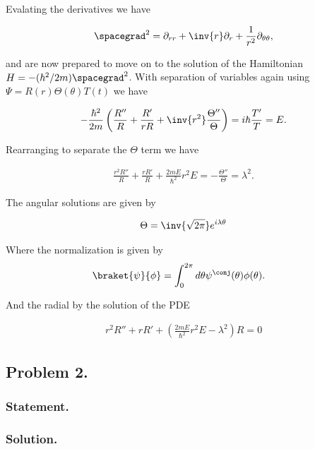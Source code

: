 Evalating the derivatives we have

\begin{align}\label{eqn:desaiCh4:150}
\spacegrad^2 = \partial_{rr} + \inv{r} \partial_r + \frac{1}{r^2} \partial_{\theta\theta},
\end{align}

and are now prepared to move on to the solution of the Hamiltonian $H = -(\hbar^2/2m) \spacegrad^2$.  With separation of variables again using $\Psi = R(r) \Theta(\theta) T(t)$ we have

\begin{align}\label{eqn:desaiCh4:151}
-\frac{\hbar^2}{2m} \left( \frac{R''}{R} + \frac{R'}{rR} + \inv{r^2} \frac{\Theta''}{\Theta} \right) = i \hbar \frac{T'}{T} = E.
\end{align}

Rearranging to separate the $\Theta$ term we have

\begin{align}\label{eqn:desaiCh4:152}
\frac{r^2 R''}{R} + \frac{r R'}{R} + \frac{2 m E}{\hbar^2} r^2 E = -\frac{\Theta''}{\Theta} = \lambda^2.
\end{align}

The angular solutions are given by 

\begin{align}\label{eqn:desaiCh4:153}
\Theta = \inv{\sqrt{2\pi}} e^{i \lambda \theta}
\end{align}

Where the normalization is given by 
\begin{align}\label{eqn:desaiCh4:160}
\braket{\psi}{\phi} &= 
\int_{0}^{2 \pi} d\theta \psi^\conj(\theta) \phi(\theta).
\end{align}

And the radial by the solution of the PDE

\begin{align}\label{eqn:desaiCh4:154}
r^2 R'' + r R' + \left( \frac{2 m E}{\hbar^2} r^2 E - \lambda^2 \right) R = 0
\end{align}

\subsection{Problem 2.}
\subsubsection{Statement.}
\subsubsection{Solution.}

